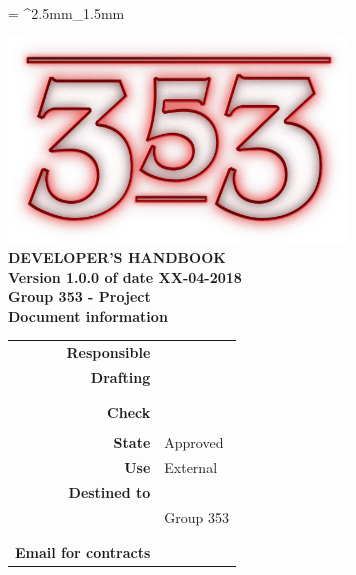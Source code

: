 \documentclass[openany, a4paper, 12pt]{report}
\begin{document}
	
	\tabulinesep = ^2.5mm_1.5mm
	
	\begin{titlepage}
		\centering
		\vfill
		{
			\bfseries
			\vskip2cm
			\includegraphics[width=9cm]{../../common/images/logo.png} \\
			\vfill
			\Huge{DEVELOPER'S HANDBOOK}\\
			\vfill
			\Large Version 1.0.0 of date XX-04-2018\\ 
			\large Group 353 - Project \progetto \\
			\vfill
			\normalsize Document information\\
			\begin{table}[htbp]
				\centering
				\renewcommand\arraystretch{1.2}
				\begin{tabular}{r|l}
					\hline
					\textbf{Responsible}	& \Parwinder \\
					
					\textbf{Drafting} 		& \Elena \\
											& \Gianluca \\
											& \Valentina \\
											
					\textbf{Check} 			& \Riccardo \\	
											& \Davide \\
											
					\textbf{State} 			& Approved\\
					\textbf{Use}			& External\\
					\textbf{Destined to}   	& \Proponente\\
										& Group 353\\
										& \Vardanega\\
										& \Cardin\\
					
					\textbf{Email for contracts}	& \mailgroup
				\end{tabular}
			\end{table}
			\vfill
		}    
	\end{titlepage}
	
	\renewcommand{\contentsname}{Index}
	\tableofcontents
	\renewcommand{\listtablename}{List of Tables}
	\listoftables
	\renewcommand{\listfigurename}{List of Figures}
	\listoffigures
	\newpage
	
	
	
	
	
	
	
	
	
	
\end{document}
